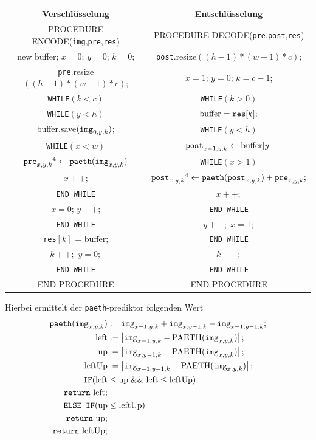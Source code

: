 \documentclass[a4paper,12pt]{article}
\begin{document}
\begin{tabular}{c|c}
Verschlüsselung & Entschlüsselung
\\
\hline
PROCEDURE ENCODE({\tt{img}},{\tt{pre}},{\tt{res}}) & PROCEDURE DECODE({\tt{pre}},{\tt{post}},{\tt{res}})
\\
new buffer; $x=0$; $y=0$; $k=0$; & {\tt{post}}.resize$((h-1)*(w-1)*c)$;
\\
{\tt{pre}}.resize$((h-1)*(w-1)*c)$; & $x=1$; $y=0$; $k=c-1$;
\\
{\tt{WHILE}}$(k < c)$ &                  {\tt{WHILE}}$(k > 0)$
\\
{\tt{WHILE}}$(y < h)$ &               $\text{buffer} = \text{{\tt{res}}}[k];$
\\
buffer.save$(\text{{\tt{img}}}_{0,y,k})$; &  {\tt{WHILE}}$(y < h)$
\\
{\tt{WHILE}}$(x < w)$ &  $\text{{\tt{post}}}_{x-1,y,k}\leftarrow \text{buffer}[y]$        
\\
$\text{{\tt{pre}}}_{x,y,k}\footnotemark[4]\leftarrow \text{{\tt{paeth}}}(\text{{\tt{img}}}_{x,y,k})$ & {\tt{WHILE}}$(x>1)$
\\
$x++$; &  $\text{{\tt{post}}}_{x,y,k}\footnotemark[4]\leftarrow \text{{\tt{paeth}}}(\text{{\tt{post}}}_{x,y,k}) + \text{{\tt{pre}}}_{x,y,k};$
\\
{\tt{END {\tt{WHILE}}}} & $x++;$
\\
$x=0$; $y++$; & {\tt{END {\tt{WHILE}}}}
\\
 {\tt{END {\tt{WHILE}}}} &  $y++;\;x=1;$
\\
 {\tt{res}}$[k]$ = buffer; &  {\tt{END {\tt{WHILE}}}} 
\\
$k++;$ $y=0;$  & $k--;$
\\
{\tt{END {\tt{WHILE}}}} & {\tt{END {\tt{WHILE}}}}  
\\
END PROCEDURE  &  END PROCEDURE
\end{tabular}

Hierbei ermittelt der {\tt{paeth}}-prediktor folgenden Wert
\begin{align*}
\text{{\tt{paeth}}}(\text{{\tt{img}}}_{x,y,k})&:= \text{{\tt{img}}}_{x-1,y,k}  + \text{{\tt{img}}}_{x,y-1,k} - \text{{\tt{img}}}_{x-1,y-1,k};
\\
\text{left}&:=\left|\text{{\tt{img}}}_{x-1,y,k} - \text{PAETH}(\text{{\tt{img}}}_{x,y,k})\right|; 
\\
\text{up}&:=\left|\text{{\tt{img}}}_{x,y-1,k} - \text{PAETH}(\text{{\tt{img}}}_{x,y,k})\right|;
\\
\text{leftUp}&:=\left|\text{{\tt{img}}}_{x-1,y-1,k} - \text{PAETH}(\text{{\tt{img}}}_{x,y,k})\right|;
\\
\text{{\tt{IF}}}(\text{left}& \leq \text{up} \;\&\&\;  \text{left} \leq \text{leftUp})
\\
\text{{\tt{return}} left;}
\\
\text{{\tt{{\tt{ELSE}} {\tt{IF}}}}}(\text{up}& \leq \text{leftUp})
\\
\text{{\tt{return}} up;}
\\
\text{{\tt{return}} leftUp;}
\end{align*}
\end{document}
